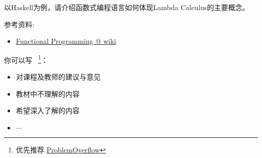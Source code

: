 \documentclass[a4paper, justified]{tufte-handout}
\begin{document}
\begin{ot}[函数式编程]
  以Haskell为例，请介绍函数式编程语言如何体现Lambda Calculus的主要概念。

  \noindent 参考资料:
  \begin{itemize}
    \item \href{https://en.wikipedia.org/wiki/Functional\_programming}{Functional Programming @ wiki}
  \end{itemize}
\end{ot}

\begincorrection

\beginfb

你可以写
~\footnote{优先推荐 \href{problemoverflow.top}{ProblemOverflow}}：
\begin{itemize}
  \item 对课程及教师的建议与意见
  \item 教材中不理解的内容
  \item 希望深入了解的内容
  \item $\cdots$
\end{itemize}
\end{document}
